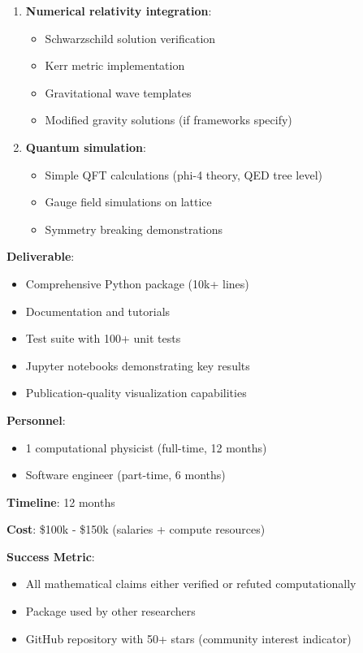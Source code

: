 \begin{enumerate}
    \item \textbf{Numerical relativity integration}:
    \begin{itemize}
        \item Schwarzschild solution verification
        \item Kerr metric implementation
        \item Gravitational wave templates
        \item Modified gravity solutions (if frameworks specify)
    \end{itemize}

    \item \textbf{Quantum simulation}:
    \begin{itemize}
        \item Simple QFT calculations (phi-4 theory, QED tree level)
        \item Gauge field simulations on lattice
        \item Symmetry breaking demonstrations
    \end{itemize}
\end{enumerate}

\textbf{Deliverable}:
\begin{itemize}
    \item Comprehensive Python package (10k+ lines)
    \item Documentation and tutorials
    \item Test suite with 100+ unit tests
    \item Jupyter notebooks demonstrating key results
    \item Publication-quality visualization capabilities
\end{itemize}

\textbf{Personnel}:
\begin{itemize}
    \item 1 computational physicist (full-time, 12 months)
    \item Software engineer (part-time, 6 months)
\end{itemize}

\textbf{Timeline}: 12 months

\textbf{Cost}: \$100k - \$150k (salaries + compute resources)

\textbf{Success Metric}:
\begin{itemize}
    \item All mathematical claims either verified or refuted computationally
    \item Package used by other researchers
    \item GitHub repository with 50+ stars (community interest indicator)
\end{itemize}

